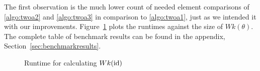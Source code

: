 The first observation is the much lower count of needed element comparisons of \ref{algo:twoa2} and \ref{algo:twoa3} in comparison to \ref{algo:twoa1}, just as we intended it with our improvements. Figure~\ref{fig:twoa123-runtime} plots the runtimes against the size of $Wk(\theta)$. The complete table of benchmark results can be found in the appendix, Section~\ref{sec:benchmarkresults}.

\begin{figure}[ht]
	\centering
	\caption{Runtime for calculating $Wk(\operatorname{id})$}
	\label{fig:twoa123-runtime}
\end{figure}